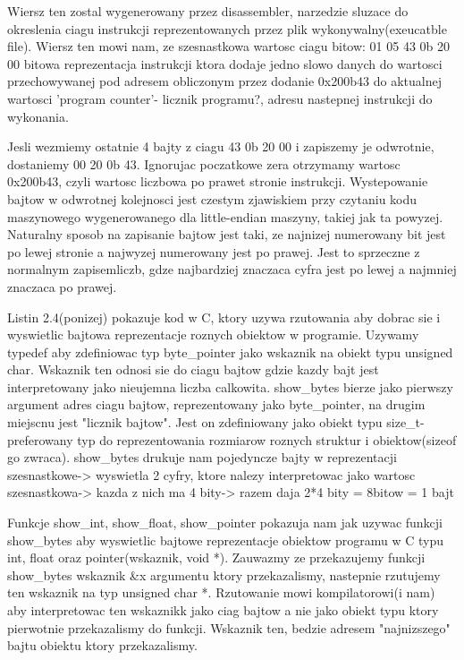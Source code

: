 \documentclass{article}
\begin{document}
Wiersz ten zostal wygenerowany przez disassembler, narzedzie sluzace do okreslenia ciagu instrukcji reprezentowanych przez plik wykonywalny(exeucatble file). 
Wiersz ten mowi nam, ze szesnastkowa wartosc ciagu bitow: 01 05 43 0b 20 00 bitowa reprezentacja instrukcji ktora dodaje jedno slowo danych do wartosci przechowywanej pod adresem obliczonym przez dodanie 0x200b43 do aktualnej wartosci 'program counter'- licznik programu?, adresu nastepnej instrukcji do wykonania. 

Jesli wezmiemy ostatnie 4 bajty z ciagu 43 0b 20 00 i zapiszemy je odwrotnie, dostaniemy 00 20 0b 43. Ignorujac poczatkowe zera otrzymamy wartosc 0x200b43, czyli wartosc liczbowa po prawet stronie instrukcji. 
Wystepowanie bajtow w odwrotnej kolejnosci jest czestym zjawiskiem przy czytaniu kodu maszynowego wygenerowanego dla little-endian maszyny, takiej jak ta powyzej. Naturalny sposob na zapisanie bajtow jest taki, ze najnizej numerowany bit jest po lewej stronie a najwyzej numerowany jest po prawej. Jest to sprzeczne z normalnym zapisemliczb, gdze najbardziej znaczaca cyfra jest po lewej a najmniej znaczaca po prawej.

Listin 2.4(ponizej) pokazuje kod w C, ktory uzywa rzutowania aby dobrac sie i wyswietlic bajtowa reprezentacje roznych obiektow w programie. Uzywamy typedef aby zdefiniowac typ byte\_pointer jako wskaznik na obiekt typu unsigned char. Wskaznik ten odnosi sie do ciagu bajtow gdzie kazdy bajt jest interpretowany jako nieujemna liczba calkowita. show\_bytes bierze jako pierwszy argument adres ciagu bajtow, reprezentowany jako byte\_pointer, na drugim miejscnu jest "licznik bajtow". Jest on zdefiniowany jako obiekt typu size\_t- preferowany typ do reprezentowania rozmiarow roznych struktur i obiektow(sizeof go zwraca). show\_bytes drukuje nam pojedyncze bajty w reprezentacji szesnastkowe-> wyswietla 2 cyfry, ktore nalezy interpretowac jako wartosc szesnastkowa-> kazda z nich ma 4 bity-> razem daja 2*4 bity = 8bitow = 1 bajt

Funkcje show\_int, show\_float, show\_pointer pokazuja nam jak uzywac funkcji show\_bytes aby wyswietlic bajtowe reprezentacje obiektow programu w C typu int, float oraz pointer(wskaznik, void *). Zauwazmy ze przekazujemy funkcji show\_bytes wskaznik \&x argumentu ktory przekazalismy, nastepnie rzutujemy ten wskaznik na typ unsigned char *.  Rzutowanie mowi kompilatorowi(i nam) aby interpretowac ten wskaznikk jako ciag bajtow a nie jako obiekt typu ktory pierwotnie przekazalismy do funkcji. Wskaznik ten, bedzie adresem "najnizszego" bajtu obiektu ktory przekazalismy.
\end{document}
